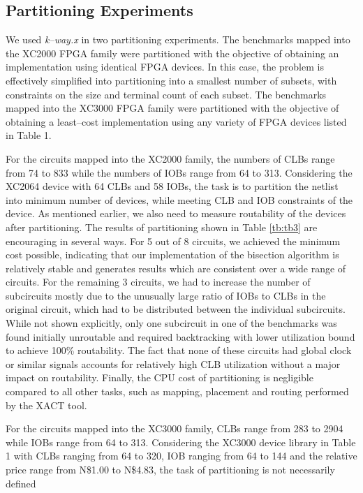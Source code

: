 \subsection{Partitioning Experiments}

We used {\em k--way.x} in two partitioning experiments.
The benchmarks mapped into the XC2000 FPGA family were partitioned 
with the objective of obtaining an implementation using identical FPGA 
devices.
In this case, the problem is effectively simplified into partitioning 
into a smallest number of subsets, with constraints on the size and 
terminal count of each subset.
The benchmarks mapped into the XC3000 FPGA family were partitioned with 
the objective of obtaining a least--cost implementation using any 
variety of FPGA devices listed in Table 1. 
\par
For the circuits mapped into the XC2000 family, the numbers of CLBs 
range from 74 to 833 while the numbers of IOBs range from 64 to 313.
Considering the XC2064 device with 64 CLBs and 58 IOBs, the task is to 
partition the netlist into minimum number of devices, while meeting CLB 
and IOB constraints of the device.
As mentioned earlier, we also need to measure routability of the devices 
after partitioning.
The results of partitioning shown in Table \ref{tb:tb3} are encouraging
in several ways.
For 5 out of 8 circuits, we achieved the minimum cost possible, 
indicating that our implementation of the bisection algorithm is 
relatively stable and generates results which are consistent over a wide 
range of circuits.
For the remaining 3 circuits, we had to increase the number of 
subcircuits mostly due to the unusually large ratio of IOBs to CLBs in 
the original circuit, which had to be distributed between the individual 
subcircuits.
While not shown explicitly, only one subcircuit in one of the benchmarks 
was found initially unroutable and required backtracking with lower 
utilization bound to achieve 100\% routability.
The fact that none of these circuits had global clock or similar signals 
accounts for relatively high CLB utilization without a major impact on 
routability.
Finally, the CPU cost of partitioning is negligible compared to all 
other tasks, such as mapping, placement and routing performed by the 
XACT tool.
\par
For the circuits mapped into the XC3000 family, CLBs range from 283 to 
2904 while IOBs range from 64 to 313.
Considering the XC3000 device library in Table 1 with CLBs
ranging from 
64 to 320, IOB ranging from 64 to 144 and the relative price range from 
N\$1.00 to N\$4.83, the task of partitioning is not necessarily defined 
